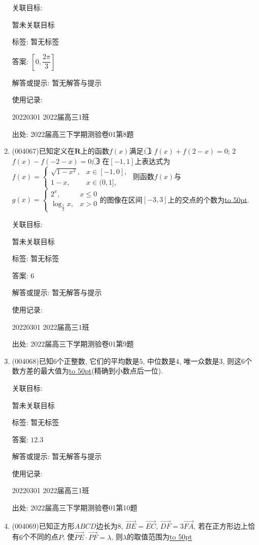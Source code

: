 \documentclass[10pt,a4paper]{article}
\newcommand{\blank}[1]{\underline{\hbox to #1pt{}}}
\begin{document}
\begin{enumerate}[1.]
关联目标:

暂未关联目标



标签: 暂无标签

答案: $[0,\dfrac{2\pi}{3}]$

解答或提示: 暂无解答与提示

使用记录:

20220301	2022届高三1班	


出处: 2022届高三下学期测验卷01第8题
\item { (004067)}已知定义在$\mathbf{R}$上的函数$f(x)$满足: \textcircled{1} $f(x)+f(2-x)=0$; \textcircled{2} $f(x)-f(-2-x)=0$; \textcircled{3} 在$[-1,1]$上表达式为$f(x)=\begin{cases} \sqrt{1-x^2}, & x\in [-1,0], \\ 1-x, & x\in (0,1], \end{cases}$ 则函数$f(x)$与$g(x)=\begin{cases} {2^x}, & x\le 0 \\ \log_\frac 12x, & x>0 \end{cases}$的图像在区间$[-3,3]$上的交点的个数为\blank{50}.


关联目标:

暂未关联目标



标签: 暂无标签

答案: $6$

解答或提示: 暂无解答与提示

使用记录:

20220301	2022届高三1班	


出处: 2022届高三下学期测验卷01第9题
\item { (004068)}已知$6$个正整数, 它们的平均数是$5$, 中位数是$4$, 唯一众数是$3$, 则这$6$个数方差的最大值为\blank{50}(精确到小数点后一位).


关联目标:

暂未关联目标



标签: 暂无标签

答案: $12.3$

解答或提示: 暂无解答与提示

使用记录:

20220301	2022届高三1班	


出处: 2022届高三下学期测验卷01第10题
\item { (004069)}已知正方形$ABCD$边长为$8$, $\overrightarrow{BE}=\overrightarrow{EC}$, $\overrightarrow{DF}=3\overrightarrow{FA}$, 若在正方形边上恰有$6$个不同的点$P$, 使$\overrightarrow{PE}\cdot \overrightarrow{PF}=\lambda$, 则$\lambda$的取值范围为\blank{50}



\end{enumerate}
\end{document}
